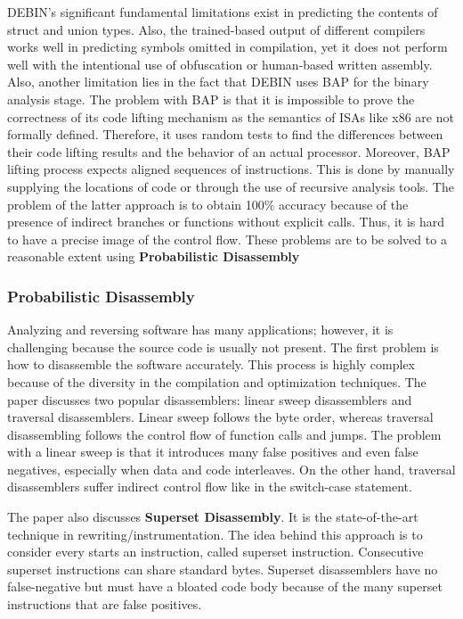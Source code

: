 \documentclass[conference,a4paper]{IEEEtran}
\begin{document}
DEBIN's significant fundamental limitations exist in predicting the contents of struct and union types. Also, the trained-based output of different compilers works well in predicting symbols omitted in compilation, yet it does not perform well with the intentional use of obfuscation or human-based written assembly. Also, another limitation lies in the fact that DEBIN uses BAP for the binary analysis stage. 
The problem with BAP is that it is impossible to prove the correctness of its code lifting mechanism as the semantics of ISAs like x86 are not formally defined. Therefore, it uses random tests to find the differences between their code lifting results and the behavior of an actual processor. Moreover, BAP lifting process expects aligned sequences of instructions. This is done by manually supplying the locations of code or through the use of recursive analysis tools.
The problem of the latter approach is to obtain 100\% accuracy because of the presence of indirect branches or functions without explicit calls. Thus, it is hard to have a precise image of the control flow. These problems are to be solved to a reasonable extent using \textbf{Probabilistic Disassembly}

\subsubsection{Probabilistic Disassembly}
Analyzing and reversing software has many applications; however, it is challenging because the source code is usually not present. The first problem is how to disassemble the software accurately. This process is highly complex because of the diversity in the compilation and optimization techniques. The paper discusses two popular disassemblers: linear sweep disassemblers and traversal disassemblers. Linear sweep follows the byte order, whereas traversal disassembling follows the control flow of function calls and jumps. The problem with a linear sweep is that it introduces many false positives and even false negatives, especially when data and code interleaves. On the other hand, traversal disassemblers suffer indirect control flow like in the switch-case statement.

The paper also discusses \textbf{Superset Disassembly}. It is the state-of-the-art technique in rewriting/instrumentation. The idea behind this approach is to consider every starts an instruction, called superset instruction. Consecutive superset instructions can share standard bytes. Superset disassemblers have no false-negative but must have a bloated code body because of the many superset instructions that are false positives.
\end{document}
